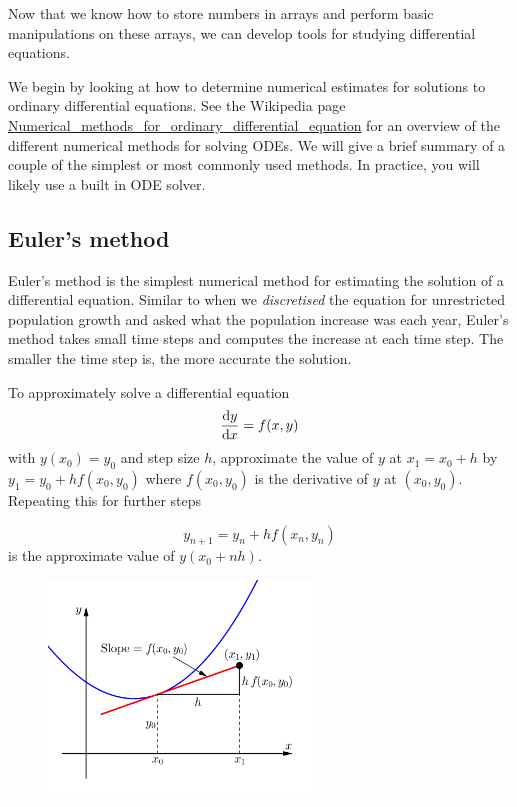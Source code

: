 \documentclass[11pt]{article}
\begin{document}
Now that we know how to store numbers in arrays and perform basic
manipulations on these arrays, we can develop tools for studying
differential equations.

We begin by looking at how to determine numerical estimates for
solutions to ordinary differential equations. See the Wikipedia page
\href{https://en.wikipedia.org/wiki/Numerical_methods_for_ordinary_differential_equations}{Numerical\_methods\_for\_ordinary\_differential\_equation}
for an overview of the different numerical methods for solving ODEs. We
will give a brief summary of a couple of the simplest or most commonly
used methods. In practice, you will likely use a built in ODE solver.

    \hypertarget{eulers-method}{%
\subsection{Euler's method}\label{eulers-method}}

Euler's method is the simplest numerical method for estimating the
solution of a differential equation. Similar to when we
\emph{discretised} the equation for unrestricted population growth and
asked what the population increase was each year, Euler's method takes
small time steps and computes the increase at each time step. The
smaller the time step is, the more accurate the solution.

To approximately solve a differential equation
\[\frac{{\rm d}y}{{\rm d} x}= f(x, y)\] with \(y(x_0)=y_0\) and step
size \(h\), approximate the value of \(y\) at \(x_1 = x_0 +h\) by
\(y_1 = y_0 + h f(x_0, y_0)\) where \(f(x_0, y_0)\) is the derivative of
\(y\) at \((x_0, y_0)\). Repeating this for further steps

\[y_{n+1} = y_n + h f(x_n,y_n)\] is the approximate value of
\(y(x_0 + nh)\).

\begin{figure}
  \centering
  \includegraphics[width=7cm]{eulerdiagram}
\end{figure}
\end{document}
